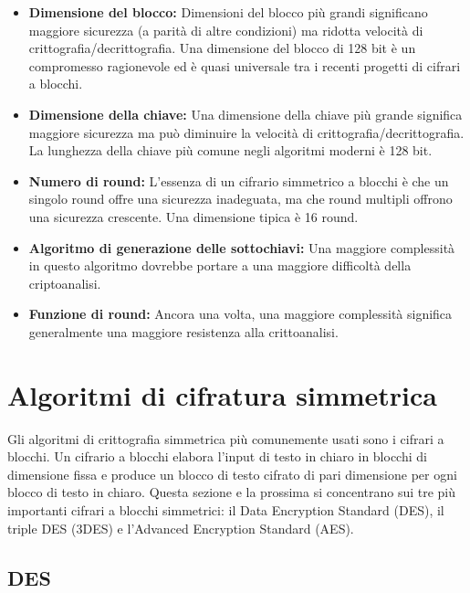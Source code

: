 \documentclass{article}
\begin{document}
\begin{itemize}
    \item \textbf{Dimensione del blocco:} Dimensioni del blocco più grandi significano maggiore sicurezza (a parità di altre condizioni) ma ridotta velocità di crittografia/decrittografia. Una dimensione del blocco di 128 bit è un compromesso ragionevole ed è quasi universale tra i recenti progetti di cifrari a blocchi.
    \item \textbf{Dimensione della chiave:} Una dimensione della chiave più grande significa maggiore sicurezza ma può diminuire la velocità di crittografia/decrittografia. La lunghezza della chiave più comune negli algoritmi moderni è 128 bit.
    \item \textbf{Numero di round:} L'essenza di un cifrario simmetrico a blocchi è che un singolo round offre una sicurezza inadeguata, ma che round multipli offrono una sicurezza crescente. Una dimensione tipica è 16 round.
    \item \textbf{Algoritmo di generazione delle sottochiavi:} Una maggiore complessità in questo algoritmo dovrebbe portare a una maggiore difficoltà della criptoanalisi.
    \item \textbf{Funzione di round:} Ancora una volta, una maggiore complessità significa generalmente una maggiore resistenza alla crittoanalisi.
\end{itemize}

\vspace{0.8cm}

\section*{Algoritmi di cifratura simmetrica}

Gli algoritmi di crittografia simmetrica più comunemente usati sono i cifrari a blocchi. Un cifrario a blocchi elabora l'input di testo in chiaro in blocchi di dimensione fissa e produce un blocco di testo cifrato di pari dimensione per ogni blocco di testo in chiaro. Questa sezione e la prossima si concentrano sui tre più importanti cifrari a blocchi simmetrici: il Data Encryption Standard (DES), il triple DES (3DES) e l'Advanced Encryption Standard (AES).

\vspace{0.5cm}

\subsection*{DES}
\end{document}

